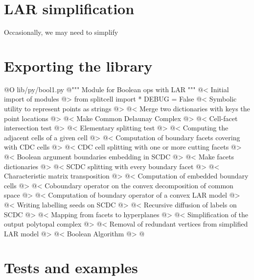 \documentclass[11pt,oneside]{article}	%
\begin{document}
\section{LAR simplification}

Occasionally, we may need to simplify 

\section{Exporting the library}


@O lib/py/bool1.py
@{""" Module for Boolean ops with LAR """
@< Initial import of modules @>
from splitcell import *
DEBUG = False
@< Symbolic utility to represent points as strings @>
@< Merge two dictionaries with keys the point locations @>
@< Make Common Delaunay Complex @>
@< Cell-facet intersection test @>
@< Elementary splitting test @>
@< Computing the adjacent cells of a given cell @>
@< Computation of boundary facets covering with CDC cells @>
@< CDC cell splitting with one or more cutting facets @>
@< Boolean argument boundaries embedding in SCDC @>
@< Make facets dictionaries @>
@< SCDC splitting with every boundary facet @>
@< Characteristic matrix transposition @>
@< Computation of embedded boundary cells @>
@< Coboundary operator on the convex decomposition of common space @>
@< Computation of boundary operator of a convex LAR model @>
@< Writing labelling seeds on SCDC @>
@< Recursive diffusion of labels on SCDC @>
@< Mapping from facets to hyperplanes @>
@< Simplification of the output polytopal complex @>
@< Removal of redundant vertices from simplified LAR model @>
@< Boolean Algorithm @>
@}




\section{Tests and examples}
\end{document}
